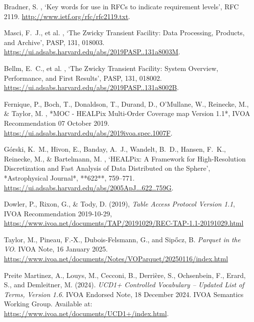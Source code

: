 \documentclass[11pt,a4paper]{ivoa}
\begin{document}
\begin{thebibliography}{}

Bradner, S.  \harvardyearright , `Key words for use in
  {RFCs} to indicate requirement levels', RFC 2119.
\newblock \url{http://www.ietf.org/rfc/rfc2119.txt}.

Masci, F.~J., et al. \harvardyearright,
`The Zwicky Transient Facility: Data Processing, Products, and Archive',
PASP, 131, 018003. \url{https://ui.adsabs.harvard.edu/abs/2019PASP..131a8003M}.

Bellm, E.~C., et al. \harvardyearright,
`The Zwicky Transient Facility: System Overview, Performance, and First Results',
PASP, 131, 018002. \url{https://ui.adsabs.harvard.edu/abs/2019PASP..131a8002B}.

Fernique, P., Boch, T., Donaldson, T., Durand, D., O'Mullane, W., Reinecke, M., \& Taylor, M.  
\harvardyearright,  
*MOC - HEALPix Multi-Order Coverage map Version 1.1*,  
IVOA Recommendation 07 October 2019.  
\url{https://ui.adsabs.harvard.edu/abs/2019ivoa.spec.1007F}.

G{\'o}rski, K.~M., Hivon, E., Banday, A.~J., Wandelt, B.~D., Hansen, F.~K., Reinecke, M., \& Bartelmann, M.  
\harvardyearright,  
`HEALPix: A Framework for High-Resolution Discretization and Fast Analysis of Data Distributed on the Sphere',  
*Astrophysical Journal*, **622**, 759–771.  
\url{https://ui.adsabs.harvard.edu/abs/2005ApJ...622..759G}.

Dowler, P., Rixon, G., \& Tody, D. (2019),
\emph{Table Access Protocol Version 1.1},
IVOA Recommendation 2019-10-29, \url{https://www.ivoa.net/documents/TAP/20191029/REC-TAP-1.1-20191029.html}

Taylor, M., Pineau, F.-X., Dubois-Felsmann, G., and Sipőcz, B. \emph{Parquet in the VO}. IVOA Note, 16 January 2025. \url{https://www.ivoa.net/documents/Notes/VOParquet/20250116/index.html}

Preite Martinez, A., Louys, M., Cecconi, B., Derrière, S., Ochsenbein, F., Erard, S., and Demleitner, M. (2024). \emph{UCD1+ Controlled Vocabulary – Updated List of Terms, Version 1.6}. IVOA Endorsed Note, 18 December 2024. IVOA Semantics Working Group. Available at: \url{https://www.ivoa.net/documents/UCD1+/index.html}.

\end{thebibliography}
\end{document}
